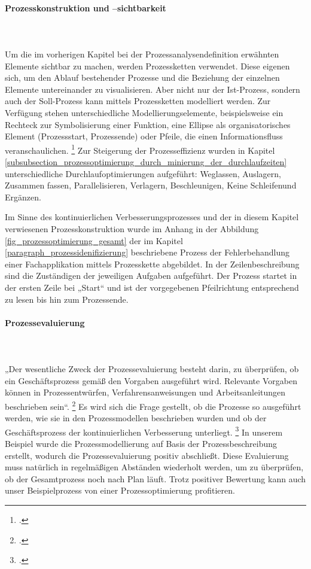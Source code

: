 \paragraph{Prozesskonstruktion und –sichtbarkeit}\mbox{}\\\\
\label{paragraph_prozesskonstruktion_und_sichtbarkeit}
Um die im vorherigen Kapitel bei der Prozessanalysendefinition erwähnten Elemente sichtbar zu machen, werden Prozessketten verwendet. Diese eigenen sich, um den Ablauf bestehender Prozesse und die Beziehung der einzelnen Elemente untereinander zu visualisieren. Aber nicht nur der Ist-Prozess, sondern auch der Soll-Prozess kann mittels Prozessketten modelliert werden. Zur Verfügung stehen unterschiedliche Modellierungselemente, beispielsweise ein Rechteck zur Symbolisierung einer Funktion, eine Ellipse als organisatorisches Element (Prozessstart, Prozessende) oder Pfeile, die einen Informationsfluss veranschaulichen. \footcite[Vgl.][64]{krcmar_einfuhrung_2015} Zur Steigerung der Prozesseffizienz wurden in Kapitel \ref{subsubsection_prozessoptimierung_durch_minierung_der_durchlaufzeiten} unterschiedliche Durchlaufoptimierungen aufgeführt: \glqq Weglassen\grqq, \glqq Auslagern\grqq, \glqq Zusammen fassen\grqq, \glqq Parallelisieren\grqq, \glqq Verlagern\grqq, \glqq Beschleunigen\grqq, \glqq Keine Schleifen\grqq und \glqq Ergänzen\grqq.

Im Sinne des kontinuierlichen Verbesserungsprozesses und der in diesem Kapitel verwiesenen Prozesskonstruktion wurde im Anhang in der Abbildung \ref{fig_prozessoptimierung_gesamt} der im Kapitel \ref{paragraph_prozessidenifizierung} beschriebene Prozess der Fehlerbehandlung einer Fachapplikation mittels Prozesskette abgebildet. In der Zeilenbeschreibung sind die Zuständigen der jeweiligen Aufgaben aufgeführt. Der Prozess startet in der ersten Zeile bei „Start“ und ist der vorgegebenen Pfeilrichtung entsprechend zu lesen bis hin zum Prozessende.

\paragraph{Prozessevaluierung}\mbox{}\\\\
„Der wesentliche Zweck der Prozessevaluierung besteht darin, zu überprüfen, ob ein Geschäftsprozess gemäß den Vorgaben ausgeführt wird. Relevante Vorgaben können in Prozessentwürfen, Verfahrensanweisungen und Arbeitsanleitungen beschrieben sein“. \footcite[277]{heinrich_stelzer_2011} Es wird sich die Frage gestellt, ob die Prozesse so ausgeführt werden, wie sie in den Prozessmodellen beschrieben wurden und ob der Geschäftsprozess der kontinuierlichen Verbesserung unterliegt. \footcite[Vgl.][277]{heinrich_stelzer_2011} In unserem Beispiel wurde die Prozessmodellierung auf Basis der Prozessbeschreibung erstellt, wodurch die Prozessevaluierung positiv abschließt. Diese Evaluierung muss natürlich in regelmäßigen Abständen wiederholt werden, um zu überprüfen, ob der Gesamtprozess noch nach Plan läuft. Trotz positiver Bewertung kann auch unser Beispielprozess von einer Prozessoptimierung profitieren.

